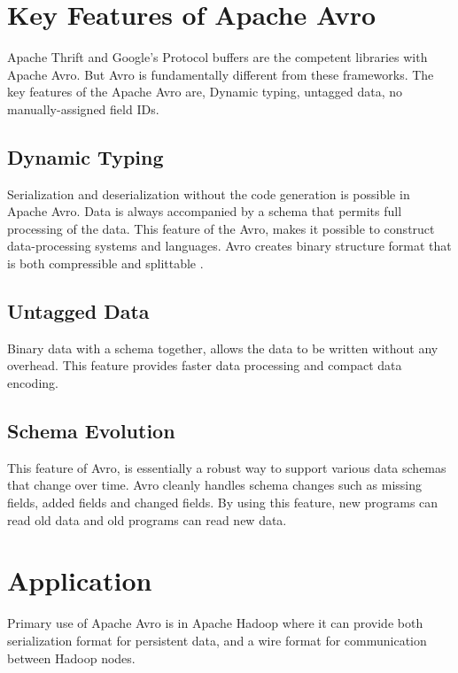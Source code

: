 \documentclass[9pt,twocolumn,twoside]{../../styles/osajnl}
\begin{document}
\section{Key Features of Apache Avro}

Apache Thrift and Google’s Protocol buffers are the competent
libraries with Apache Avro. But Avro is fundamentally different from
these frameworks. The key features of the Apache Avro are, Dynamic
typing, untagged data, no manually-assigned field IDs.

\subsection{Dynamic Typing}

Serialization and deserialization without the code generation is
possible in Apache Avro. Data is always accompanied by a schema that
permits full processing of the data. This feature of the Avro, makes
it possible to construct data-processing systems and languages. Avro
creates binary structure format that is both compressible and
splittable \cite{www-tutorialspoint-avro}.

\subsection{Untagged Data}

Binary data with a schema together, allows the data to be written
without any overhead. This feature provides faster data processing and
compact data encoding.

\subsection{Schema Evolution}

This feature of Avro, is essentially a robust way to support various
data schemas that change over time.  Avro cleanly handles schema
changes such as missing fields, added fields and changed fields. By
using this feature, new programs can read old data and old programs
can read new data.

\section{Application}

Primary use of Apache Avro is in Apache Hadoop where it can provide
both serialization format for persistent data, and a wire format for
communication between Hadoop nodes.
\end{document}
